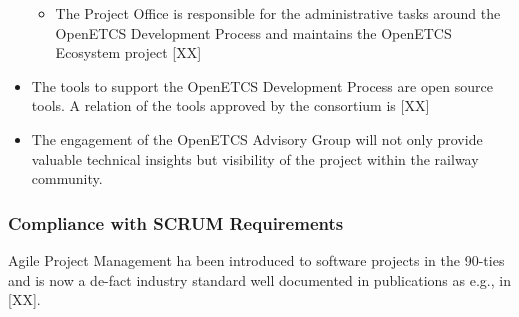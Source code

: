 \documentclass{template/openetcs_article}
\begin{document}
\begin{itemize}
\begin{itemize}
\item The Project Office is responsible for the administrative tasks around the OpenETCS Development Process and maintains the OpenETCS Ecosystem project [XX]
\end{itemize}
\item The tools to support the OpenETCS Development Process are open source tools. A relation of the tools approved by the consortium is [XX]
\item The engagement of the OpenETCS Advisory Group will not only provide valuable technical insights but visibility of the project within the railway community.
\end{itemize}

\subsubsection{Compliance with SCRUM Requirements}
Agile Project Management ha been introduced to software projects in the 90-ties and is now a de-fact industry standard well documented in publications as e.g., in [XX].
\end{document}
